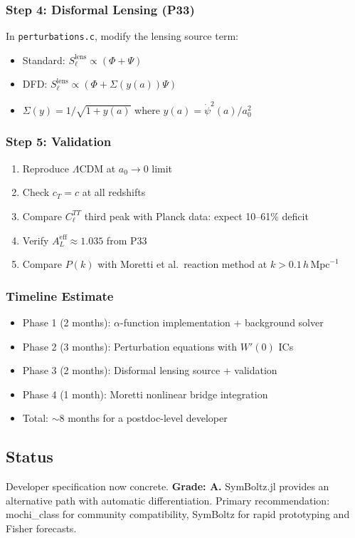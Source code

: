 \documentclass[11pt,a4paper]{article}
\begin{document}
\subsubsection{Step 4: Disformal Lensing (P33)}

In \texttt{perturbations.c}, modify the lensing source term:
\begin{itemize}
\item Standard: $S_\ell^\mathrm{lens} \propto (\Phi + \Psi)$
\item DFD: $S_\ell^\mathrm{lens} \propto (\Phi + \Sigma(y(a))\Psi)$
\item $\Sigma(y) = 1/\sqrt{1 + y(a)}$ where $y(a) = \dot{\psi}^2(a)/a_0^2$
\end{itemize}

\subsubsection{Step 5: Validation}

\begin{enumerate}
\item Reproduce $\Lambda$CDM at $a_0 \to 0$ limit
\item Check $c_T = c$ at all redshifts
\item Compare $C_\ell^{TT}$ third peak with Planck data: expect 10--61\% deficit
\item Verify $A_L^\mathrm{eff} \approx 1.035$ from P33
\item Compare $P(k)$ with Moretti et al.\ reaction method at $k > 0.1\,h\,\mathrm{Mpc}^{-1}$
\end{enumerate}

\subsubsection{Timeline Estimate}
\begin{itemize}
\item Phase 1 (2 months): $\alpha$-function implementation + background solver
\item Phase 2 (3 months): Perturbation equations with $W'(0)$ ICs
\item Phase 3 (2 months): Disformal lensing source + validation
\item Phase 4 (1 month): Moretti nonlinear bridge integration
\item Total: $\sim$8 months for a postdoc-level developer
\end{itemize}

\subsection{Status}
Developer specification now concrete. \textbf{Grade: A.} SymBoltz.jl provides an alternative path with automatic differentiation. Primary recommendation: mochi\_class for community compatibility, SymBoltz for rapid prototyping and Fisher forecasts.
\end{document}
